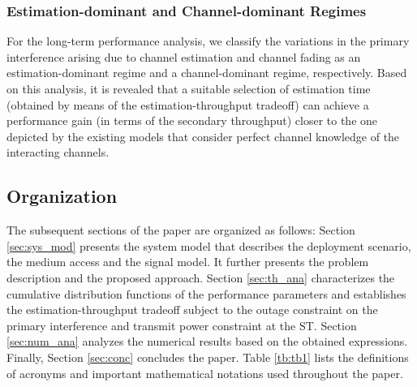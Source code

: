 \subsubsection{Estimation-dominant and Channel-dominant Regimes}
For the long-term performance analysis, we classify the variations in the primary interference arising due to channel estimation and channel fading as an estimation-dominant regime and a channel-dominant regime, respectively. Based on this analysis, it is revealed that a suitable selection of estimation time (obtained by means of the estimation-throughput tradeoff) can achieve a performance gain (in terms of the secondary throughput) closer to the one depicted by the existing models that consider perfect channel knowledge of the interacting channels. 

\subsection{Organization}
The subsequent sections of the paper are organized as follows: Section \ref{sec:sys_mod} presents the system model that describes the deployment scenario, the medium access and the signal model. It further presents the problem description and the proposed approach. Section \ref{sec:th_ana} characterizes the cumulative distribution functions of the performance parameters and establishes the estimation-throughput tradeoff subject to the outage constraint on the primary interference and transmit power constraint at the ST. Section \ref{sec:num_ana} analyzes the numerical results based on the obtained expressions. Finally, Section \ref{sec:conc} concludes the paper. Table \ref{tb:tb1} lists the definitions of acronyms and important mathematical notations used throughout the paper.


